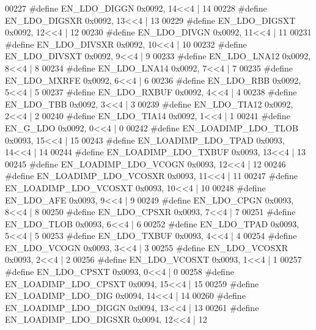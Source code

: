 \begin{DoxyCode}
00227 \textcolor{preprocessor}{#define EN\_LDO\_DIGGN 0x0092, 14<<4 |  14}
00228 \textcolor{preprocessor}{#define EN\_LDO\_DIGSXR 0x0092, 13<<4 |  13}
00229 \textcolor{preprocessor}{#define EN\_LDO\_DIGSXT 0x0092, 12<<4 |  12}
00230 \textcolor{preprocessor}{#define EN\_LDO\_DIVGN 0x0092, 11<<4 |  11}
00231 \textcolor{preprocessor}{#define EN\_LDO\_DIVSXR 0x0092, 10<<4 |  10}
00232 \textcolor{preprocessor}{#define EN\_LDO\_DIVSXT 0x0092, 9<<4 |  9}
00233 \textcolor{preprocessor}{#define EN\_LDO\_LNA12 0x0092, 8<<4 |  8}
00234 \textcolor{preprocessor}{#define EN\_LDO\_LNA14 0x0092, 7<<4 |  7}
00235 \textcolor{preprocessor}{#define EN\_LDO\_MXRFE 0x0092, 6<<4 |  6}
00236 \textcolor{preprocessor}{#define EN\_LDO\_RBB 0x0092, 5<<4 |  5}
00237 \textcolor{preprocessor}{#define EN\_LDO\_RXBUF 0x0092, 4<<4 |  4}
00238 \textcolor{preprocessor}{#define EN\_LDO\_TBB 0x0092, 3<<4 |  3}
00239 \textcolor{preprocessor}{#define EN\_LDO\_TIA12 0x0092, 2<<4 |  2}
00240 \textcolor{preprocessor}{#define EN\_LDO\_TIA14 0x0092, 1<<4 |  1}
00241 \textcolor{preprocessor}{#define EN\_G\_LDO 0x0092, 0<<4 |  0}
00242 \textcolor{preprocessor}{#define EN\_LOADIMP\_LDO\_TLOB 0x0093, 15<<4 |  15}
00243 \textcolor{preprocessor}{#define EN\_LOADIMP\_LDO\_TPAD 0x0093, 14<<4 |  14}
00244 \textcolor{preprocessor}{#define EN\_LOADIMP\_LDO\_TXBUF 0x0093, 13<<4 |  13}
00245 \textcolor{preprocessor}{#define EN\_LOADIMP\_LDO\_VCOGN 0x0093, 12<<4 |  12}
00246 \textcolor{preprocessor}{#define EN\_LOADIMP\_LDO\_VCOSXR 0x0093, 11<<4 |  11}
00247 \textcolor{preprocessor}{#define EN\_LOADIMP\_LDO\_VCOSXT 0x0093, 10<<4 |  10}
00248 \textcolor{preprocessor}{#define EN\_LDO\_AFE 0x0093, 9<<4 |  9}
00249 \textcolor{preprocessor}{#define EN\_LDO\_CPGN 0x0093, 8<<4 |  8}
00250 \textcolor{preprocessor}{#define EN\_LDO\_CPSXR 0x0093, 7<<4 |  7}
00251 \textcolor{preprocessor}{#define EN\_LDO\_TLOB 0x0093, 6<<4 |  6}
00252 \textcolor{preprocessor}{#define EN\_LDO\_TPAD 0x0093, 5<<4 |  5}
00253 \textcolor{preprocessor}{#define EN\_LDO\_TXBUF 0x0093, 4<<4 |  4}
00254 \textcolor{preprocessor}{#define EN\_LDO\_VCOGN 0x0093, 3<<4 |  3}
00255 \textcolor{preprocessor}{#define EN\_LDO\_VCOSXR 0x0093, 2<<4 |  2}
00256 \textcolor{preprocessor}{#define EN\_LDO\_VCOSXT 0x0093, 1<<4 |  1}
00257 \textcolor{preprocessor}{#define EN\_LDO\_CPSXT 0x0093, 0<<4 |  0}
00258 \textcolor{preprocessor}{#define EN\_LOADIMP\_LDO\_CPSXT 0x0094, 15<<4 |  15}
00259 \textcolor{preprocessor}{#define EN\_LOADIMP\_LDO\_DIG 0x0094, 14<<4 |  14}
00260 \textcolor{preprocessor}{#define EN\_LOADIMP\_LDO\_DIGGN 0x0094, 13<<4 |  13}
00261 \textcolor{preprocessor}{#define EN\_LOADIMP\_LDO\_DIGSXR 0x0094, 12<<4 |  12}

\end{DoxyCode}
